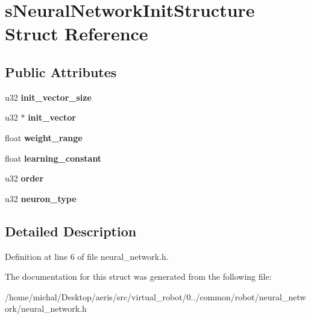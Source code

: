 \hypertarget{structsNeuralNetworkInitStructure}{\section{s\-Neural\-Network\-Init\-Structure Struct Reference}
\label{structsNeuralNetworkInitStructure}
}
\subsection*{Public Attributes}
\begin{DoxyCompactItemize}
\item 
\hypertarget{structsNeuralNetworkInitStructure_a1631b065b3e498501560fc01459e5cd6}{u32 {\bfseries init\-\_\-vector\-\_\-size}}\label{structsNeuralNetworkInitStructure_a1631b065b3e498501560fc01459e5cd6}

\item 
\hypertarget{structsNeuralNetworkInitStructure_af304870dfad5e2edd63d65e07823277b}{u32 $\ast$ {\bfseries init\-\_\-vector}}\label{structsNeuralNetworkInitStructure_af304870dfad5e2edd63d65e07823277b}

\item 
\hypertarget{structsNeuralNetworkInitStructure_a178a18e0fbce1fde7aee0a573ca73844}{float {\bfseries weight\-\_\-range}}\label{structsNeuralNetworkInitStructure_a178a18e0fbce1fde7aee0a573ca73844}

\item 
\hypertarget{structsNeuralNetworkInitStructure_a711d79f75658f78332439172b5d1d218}{float {\bfseries learning\-\_\-constant}}\label{structsNeuralNetworkInitStructure_a711d79f75658f78332439172b5d1d218}

\item 
\hypertarget{structsNeuralNetworkInitStructure_a1d256740ebce6dd49c27c7f24f227ffa}{u32 {\bfseries order}}\label{structsNeuralNetworkInitStructure_a1d256740ebce6dd49c27c7f24f227ffa}

\item 
\hypertarget{structsNeuralNetworkInitStructure_a73c705e844c05b2ca59a42a77e52e130}{u32 {\bfseries neuron\-\_\-type}}\label{structsNeuralNetworkInitStructure_a73c705e844c05b2ca59a42a77e52e130}

\end{DoxyCompactItemize}


\subsection{Detailed Description}


Definition at line 6 of file neural\-\_\-network.\-h.



The documentation for this struct was generated from the following file\-:\begin{DoxyCompactItemize}
\item 
/home/michal/\-Desktop/aeris/src/virtual\-\_\-robot/0../common/robot/neural\-\_\-network/neural\-\_\-network.\-h\end{DoxyCompactItemize}

